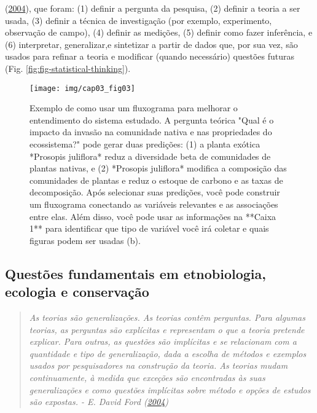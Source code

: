 \documentclass[
]{article}
\begin{document}
(\protect\hyperlink{ref-ford_scientific_2004}{2004}), que foram: (1) definir a pergunta da pesquisa, (2) definir a teoria a ser usada, (3) definir a técnica de investigação (por exemplo, experimento, observação de campo), (4) definir as medições, (5) definir como fazer inferência, e (6) interpretar, generalizar,e sintetizar a partir de dados que, por sua vez, são usados para refinar a teoria e modificar (quando necessário) questões futuras (Fig. \ref{fig:fig-statistical-thinking}).

\begin{figure}

{\centering \texttt{[image: img/cap03\_fig03]} 

}

\caption{Exemplo de como usar um fluxograma para melhorar o entendimento do sistema estudado. A pergunta teórica "Qual é o impacto da invasão na comunidade nativa e nas propriedades do ecossistema?" pode gerar duas predições: (1) a planta exótica *Prosopis juliflora* reduz a diversidade beta de comunidades de plantas nativas, e (2) *Prosopis juliflora* modifica a composição das comunidades de plantas e reduz o estoque de carbono e as taxas de decomposição. Após selecionar suas predições, você pode construir um fluxograma conectando as variáveis relevantes e as associações entre elas. Além disso, você pode usar as informações na **Caixa 1** para identificar que tipo de variável você irá coletar e quais figuras podem ser usadas (b).}\label{fig:fig-research-flowchart}
\end{figure}

\hypertarget{questuxf5es-fundamentais-em-etnobiologia-ecologia-e-conservauxe7uxe3o}{%
\subsection{Questões fundamentais em etnobiologia, ecologia e conservação}\label{questuxf5es-fundamentais-em-etnobiologia-ecologia-e-conservauxe7uxe3o}}

\begin{quote}
\emph{As teorias são generalizações. As teorias contêm perguntas. Para algumas teorias, as perguntas são explícitas e representam o que a teoria pretende explicar. Para outras, as questões são implícitas e se relacionam com a quantidade e tipo de generalização, dada a escolha de métodos e exemplos usados por pesquisadores na construção da teoria. As teorias mudam continuamente, à medida que exceções são encontradas às suas generalizações e como questões implícitas sobre método e opções de estudos são expostas. - E. David Ford (\protect\hyperlink{ref-ford_scientific_2004}{2004})}
\end{quote}
\end{document}
